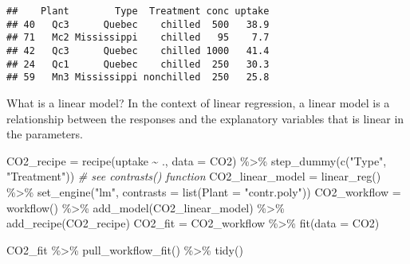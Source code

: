 \documentclass[
]{book}
\newenvironment{Shaded}{\begin{snugshade}}{\end{snugshade}}
\newcommand{\AttributeTok}[1]{\textcolor[rgb]{0.77,0.63,0.00}{#1}}
\newcommand{\CommentTok}[1]{\textcolor[rgb]{0.56,0.35,0.01}{\textit{#1}}}
\newcommand{\FunctionTok}[1]{\textcolor[rgb]{0.00,0.00,0.00}{#1}}
\newcommand{\NormalTok}[1]{#1}
\newcommand{\OtherTok}[1]{\textcolor[rgb]{0.56,0.35,0.01}{#1}}
\newcommand{\SpecialCharTok}[1]{\textcolor[rgb]{0.00,0.00,0.00}{#1}}
\newcommand{\StringTok}[1]{\textcolor[rgb]{0.31,0.60,0.02}{#1}}
\begin{document}
\begin{verbatim}
##    Plant        Type  Treatment conc uptake
## 40   Qc3      Quebec    chilled  500   38.9
## 71   Mc2 Mississippi    chilled   95    7.7
## 42   Qc3      Quebec    chilled 1000   41.4
## 24   Qc1      Quebec    chilled  250   30.3
## 59   Mn3 Mississippi nonchilled  250   25.8
\end{verbatim}

What is a linear model? In the context of linear regression, a linear
model is a relationship between the responses and the explanatory
variables that is linear in the parameters.

\begin{Shaded}
\begin{Highlighting}[]
\NormalTok{CO2\_recipe }\OtherTok{=} \FunctionTok{recipe}\NormalTok{(uptake }\SpecialCharTok{\textasciitilde{}}\NormalTok{ ., }\AttributeTok{data =}\NormalTok{ CO2) }\SpecialCharTok{\%\textgreater{}\%}
    \FunctionTok{step\_dummy}\NormalTok{(}\FunctionTok{c}\NormalTok{(}\StringTok{"Type"}\NormalTok{, }\StringTok{"Treatment"}\NormalTok{))}
\CommentTok{\# see contrasts() function}
\NormalTok{CO2\_linear\_model }\OtherTok{=} \FunctionTok{linear\_reg}\NormalTok{() }\SpecialCharTok{\%\textgreater{}\%}
    \FunctionTok{set\_engine}\NormalTok{(}\StringTok{"lm"}\NormalTok{, }\AttributeTok{contrasts =} \FunctionTok{list}\NormalTok{(}\AttributeTok{Plant =} \StringTok{"contr.poly"}\NormalTok{))}
\NormalTok{CO2\_workflow }\OtherTok{=} \FunctionTok{workflow}\NormalTok{() }\SpecialCharTok{\%\textgreater{}\%}
    \FunctionTok{add\_model}\NormalTok{(CO2\_linear\_model) }\SpecialCharTok{\%\textgreater{}\%}
    \FunctionTok{add\_recipe}\NormalTok{(CO2\_recipe)}
\NormalTok{CO2\_fit }\OtherTok{=}\NormalTok{ CO2\_workflow }\SpecialCharTok{\%\textgreater{}\%}
    \FunctionTok{fit}\NormalTok{(}\AttributeTok{data =}\NormalTok{ CO2)}
\end{Highlighting}
\end{Shaded}

\begin{Shaded}
\begin{Highlighting}[]
\NormalTok{CO2\_fit }\SpecialCharTok{\%\textgreater{}\%}
    \FunctionTok{pull\_workflow\_fit}\NormalTok{() }\SpecialCharTok{\%\textgreater{}\%}
    \FunctionTok{tidy}\NormalTok{()}
\end{Highlighting}
\end{Shaded}
\end{document}

